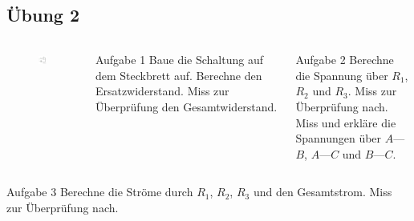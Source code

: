 \subsection*{Übung 2}
\begin{frame}
  \begin{columns}
    \begin{center}
      \begin{figure}
        \includegraphics[width=1\textwidth]{e04/Uebung2_Schaltplan.pdf}
      \end{figure}
    \end{center}
    \begin{alertblock}{Aufgabe 1}
      Baue die Schaltung auf dem Steckbrett auf.
      Berechne den Ersatzwiderstand. Miss zur Überprüfung den Gesamtwiderstand.
    \end{alertblock}
    \begin{alertblock}{Aufgabe 2}
      Berechne die Spannung über $R_1$, $R_2$ und $R_3$. Miss zur Überprüfung nach.\\
      Miss und erkläre die Spannungen über $A$---$B$, $A$---$C$ und $B$---$C$.
    \end{alertblock}
  \end{columns}
  \begin{alertblock}{Aufgabe 3}
    Berechne die Ströme durch $R_1$, $R_2$, $R_3$ und den Gesamtstrom. Miss zur Überprüfung nach.
  \end{alertblock}
\end{frame}

